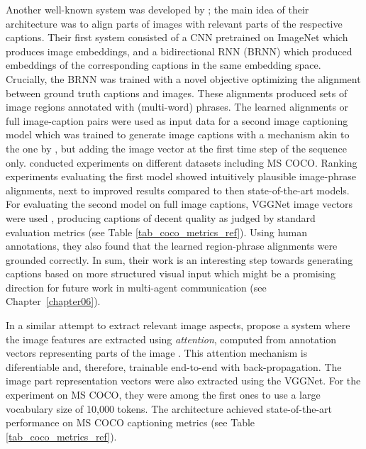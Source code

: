 Another well-known system was developed by \cite{karpathy2015deep}; the main idea of their architecture was to align parts of images with relevant parts of the respective captions. 
Their first system consisted of a CNN pretrained on ImageNet which produces image embeddings, and a bidirectional RNN (BRNN) which produced embeddings of the corresponding captions in the same embedding space. Crucially, the BRNN was trained with a novel objective optimizing the alignment between ground truth captions and images. %
These alignments produced sets of image regions annotated with (multi-word) phrases.
The learned alignments or full image-caption pairs were used as input data for a second image captioning model which was trained to generate image captions with a mechanism akin to the one by \cite{vinyals2015show}, but adding the image vector at the first time step of the sequence only. \cite{karpathy2015deep} conducted experiments on different datasets including MS COCO. Ranking experiments evaluating the first model showed intuitively plausible image-phrase alignments, next to improved results compared to then state-of-the-art models. 
For evaluating the second model on full image captions, VGGNet image vectors were used \parencite{simonyan2014very}, producing captions of decent quality as judged by standard evaluation metrics (see Table \ref{tab_coco_metrics_ref}). Using human annotations, they also found that the learned region-phrase alignments were grounded correctly. %
In sum, their work is an interesting step towards generating captions based on more structured visual input which might be a promising direction for future work in multi-agent communication (see Chapter~\ref{chapter06}).

In a similar attempt to extract relevant image aspects, \cite{xu2015show} propose a system where the image features are extracted using \textit{attention}, computed from annotation vectors representing parts of the image \parencite{bahdanau2014neural}. %
This attention mechanism is diferentiable and, therefore, trainable end-to-end with back-propagation. The image part representation vectors were also extracted using the VGGNet. 
For the experiment on MS COCO, they were among the first ones to use a large vocabulary size of 10,000 tokens. The architecture achieved state-of-the-art performance on MS COCO captioning metrics (see Table \ref{tab_coco_metrics_ref}).%

